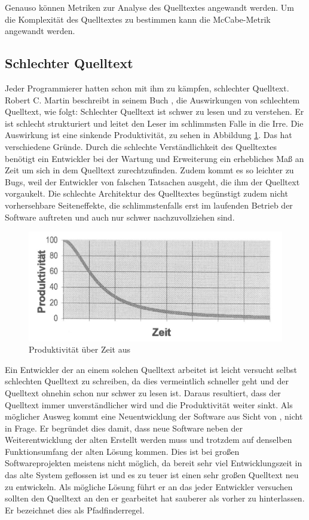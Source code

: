 Genauso können Metriken zur Analyse des Quelltextes angewandt werden. Um die Komplexität des Quelltextes zu bestimmen kann die McCabe-Metrik\cite{McCabe} angewandt werden.

\subsection{Schlechter Quelltext}

Jeder Programmierer hatten schon mit ihm zu kämpfen, schlechter Quelltext. Robert C. Martin beschreibt in seinem Buch \cite[S. 27f.]{Martin}, die Auswirkungen von schlechtem Quelltext, wie folgt: Schlechter Quelltext ist schwer zu lesen und zu verstehen. Er ist schlecht strukturiert und leitet den Leser im schlimmsten Falle in die Irre.
Die Auswirkung ist eine sinkende Produktivität, zu sehen in Abbildung \ref{grundlagen:produktivitaet}.
Das hat verschiedene Gründe. Durch die schlechte Verständlichkeit des Quelltextes benötigt ein Entwickler bei der Wartung und Erweiterung ein erhebliches Maß an Zeit um sich in dem Quelltext zurechtzufinden. Zudem kommt es so leichter zu Bugs, weil der Entwickler von falschen Tatsachen ausgeht, die ihm der Quelltext vorgaukelt. Die schlechte Architektur des Quelltextes begünstigt zudem nicht vorhersehbare Seiteneffekte, die schlimmstenfalls erst im laufenden Betrieb der Software auftreten und auch nur schwer nachzuvollziehen sind.

\begin{figure}[H]
	\centering
	\includegraphics[width=\textwidth]{poduktivitaet.jpg}
	\caption{Produktivität über Zeit aus \cite[S. 29]{Martin}}
	\label{grundlagen:produktivitaet}
\end{figure}

Ein Entwickler der an einem solchen Quelltext arbeitet ist leicht versucht selbst schlechten Quelltext zu schreiben, da dies vermeintlich schneller geht und der Quelltext ohnehin schon nur schwer zu lesen ist. Daraus resultiert, dass der Quelltext immer unverständlicher wird und die Produktivität weiter sinkt.
Als möglicher Ausweg kommt eine Neuentwicklung der Software aus Sicht von \cite[S. 29f.]{Martin}, nicht in Frage.
Er begründet dies damit, dass neue Software neben der Weiterentwicklung der alten Erstellt werden muss und trotzdem auf denselben Funktionsumfang der alten Lösung kommen. Dies ist bei großen Softwareprojekten meistens nicht möglich, da bereit sehr viel Entwicklungszeit in das alte System geflossen ist und es zu teuer ist einen sehr großen Quelltext neu zu entwickeln. Als mögliche Lösung führt er an das jeder Entwickler versuchen sollten den Quelltext an den er gearbeitet hat sauberer als vorher zu hinterlassen. Er bezeichnet dies als Pfadfinderregel.

